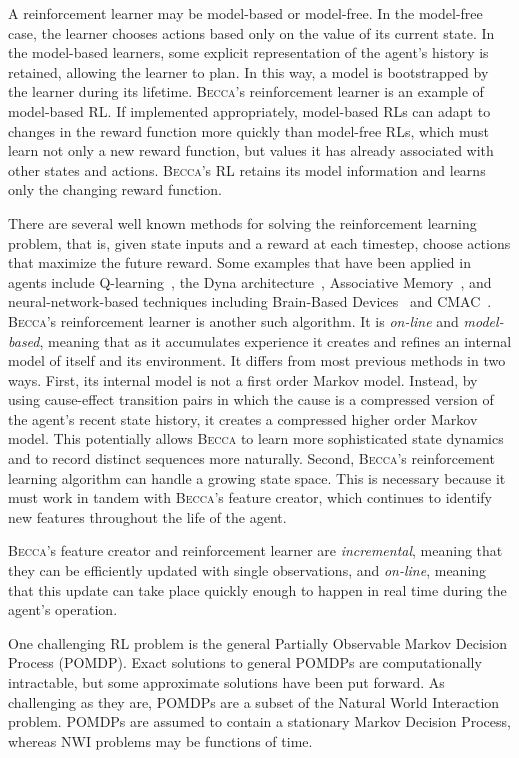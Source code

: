 A reinforcement learner may be model-based or model-free. In the model-free case, the learner chooses actions based only on the value of its current state. In the model-based learners, some explicit representation of the agent's history is retained, allowing the learner to plan. In this way, a model is bootstrapped by the learner during its lifetime. \textsc{Becca}'s reinforcement learner is an example of model-based RL. If implemented appropriately, model-based RLs can adapt to changes in the reward function more quickly than model-free RLs, which must learn not only a new reward function, but values it has already associated with other states and actions. \textsc{Becca}'s RL retains its model information and learns only the changing reward function.

There are several well known methods for solving the reinforcement learning problem, that is, given state inputs and a reward at each timestep, choose actions that maximize the future reward. Some examples that have been applied in agents include Q-learning~\cite{watkins92}, the Dyna architecture~\cite{sutton91}, Associative Memory~\cite{levinson05}, and neural-network-based techniques including Brain-Based Devices~\cite{mckinstry06} and CMAC~\cite{albus75}. \textsc{Becca}'s reinforcement learner is another such algorithm. It is {\em on-line} and {\em model-based}, meaning that as it accumulates experience it creates and refines an internal model of itself and its environment. It differs from most previous methods in two ways. First, its internal model is not a first order Markov model. Instead, by using cause-effect transition pairs in which the cause is a compressed version of the agent's recent state history, it creates a compressed higher order Markov model. This potentially allows \textsc{Becca} to learn more sophisticated state dynamics and to record distinct sequences more naturally. Second, \textsc{Becca}'s reinforcement learning algorithm can handle a growing state space. This is necessary because it must work in tandem with \textsc{Becca}'s feature creator, which continues to identify new features throughout the life of the agent.

\textsc{Becca}'s feature creator and reinforcement learner are {\em incremental}, meaning that they can be efficiently updated with single observations, and {\em on-line}, meaning that this update can take place quickly enough to happen in real time during the agent's operation.

One challenging RL problem is the general Partially Observable Markov Decision Process (POMDP). Exact solutions to general POMDPs are computationally intractable, but some approximate solutions have been put forward. As challenging as they are, POMDPs are a subset of the Natural World Interaction problem. POMDPs are assumed to contain a stationary Markov Decision Process, whereas NWI problems may be functions of time.

